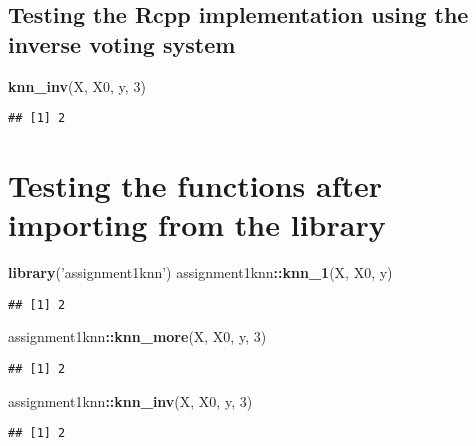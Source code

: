 \documentclass[]{article}
\newenvironment{Shaded}{\begin{snugshade}}{\end{snugshade}}
\newcommand{\DecValTok}[1]{\textcolor[rgb]{0.00,0.00,0.81}{#1}}
\newcommand{\KeywordTok}[1]{\textcolor[rgb]{0.13,0.29,0.53}{\textbf{#1}}}
\newcommand{\NormalTok}[1]{#1}
\newcommand{\OperatorTok}[1]{\textcolor[rgb]{0.81,0.36,0.00}{\textbf{#1}}}
\newcommand{\StringTok}[1]{\textcolor[rgb]{0.31,0.60,0.02}{#1}}
\begin{document}
\hypertarget{testing-the-rcpp-implementation-using-the-inverse-voting-system}{%
\subsection{Testing the Rcpp implementation using the inverse voting
system}\label{testing-the-rcpp-implementation-using-the-inverse-voting-system}}

\begin{Shaded}
\begin{Highlighting}[]
\KeywordTok{knn_inv}\NormalTok{(X, X0, y, }\DecValTok{3}\NormalTok{)}
\end{Highlighting}
\end{Shaded}

\begin{verbatim}
## [1] 2
\end{verbatim}

\hypertarget{testing-the-functions-after-importing-from-the-library}{%
\section{Testing the functions after importing from the
library}\label{testing-the-functions-after-importing-from-the-library}}

\begin{Shaded}
\begin{Highlighting}[]
\KeywordTok{library}\NormalTok{(}\StringTok{'assignment1knn'}\NormalTok{)}
\NormalTok{assignment1knn}\OperatorTok{::}\KeywordTok{knn_1}\NormalTok{(X, X0, y)}
\end{Highlighting}
\end{Shaded}

\begin{verbatim}
## [1] 2
\end{verbatim}

\begin{Shaded}
\begin{Highlighting}[]
\NormalTok{assignment1knn}\OperatorTok{::}\KeywordTok{knn_more}\NormalTok{(X, X0, y, }\DecValTok{3}\NormalTok{)}
\end{Highlighting}
\end{Shaded}

\begin{verbatim}
## [1] 2
\end{verbatim}

\begin{Shaded}
\begin{Highlighting}[]
\NormalTok{assignment1knn}\OperatorTok{::}\KeywordTok{knn_inv}\NormalTok{(X, X0, y, }\DecValTok{3}\NormalTok{)}
\end{Highlighting}
\end{Shaded}

\begin{verbatim}
## [1] 2
\end{verbatim}
\end{document}
